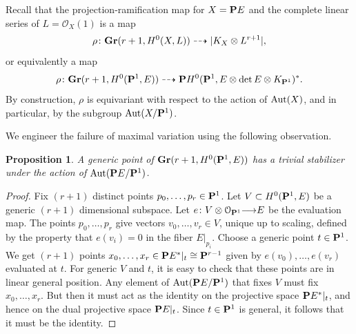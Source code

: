 \documentclass[11pt,reqno]{amsart}
\theoremstyle{plain}
\newtheorem{proposition}[theorem]{Proposition}
\theoremstyle{definition}
\theoremstyle{remark}
\numberwithin{equation}{section}
\renewcommand{\to}{{\longrightarrow}}
\numberwithin{equation}{section}
\renewcommand{\O}{\mathcal O}
\begin{document}
Recall that the projection-ramification map for $X = \P E$ and the complete linear series of $L = \O_X(1)$ is a map
\[ \rho \from \Gr(r+1, H^0(X, L)) \dashrightarrow |K_X \otimes L^{r+1}|,\]
or equivalently a map
\[ \rho \from \Gr(r+1, H^0(\P^1, E)) \dashrightarrow \P H^0(\P^1, E \otimes \det E \otimes K_{\P^1})^*.\]
By construction, $\rho$ is equivariant with respect to the action of $\Aut(X)$, and in particular, by the subgroup $\Aut(X/\P^1)$.

We engineer the failure of maximal variation using the following observation.
\begin{proposition}\label{prop:trivialStabilizer}
  A generic point of $\Gr(r+1, H^0(\P^1, E))$ has a trivial stabilizer under the action of $\Aut(\P E/\P^1)$.
\end{proposition}
\begin{proof}
  Fix $(r+1)$ distinct points $p_0, \dots, p_r \in \P^1$.
  Let $V \subset H^0(\P^1, E)$ be a generic $(r+1)$ dimensional subspace.
  Let $e \from V \otimes \O_{\P^1} \to E$ be the evaluation map.
  The points $p_0, \dots, p_r$ give vectors $v_0, \dots, v_r \in V$, unique up to scaling, defined by the property that $e(v_i) = 0$ in the fiber $E|_{p_i}$.
  Choose a generic point $t \in \P^1$.
  We get $(r+1)$ points $x_0, \dots, x_r \in \P E^*|_{t} \cong \P^{r-1}$ given by $e(v_0), \dots, e(v_r)$ evaluated at $t$.
  For generic $V$ and $t$, it is easy to check that these points are in linear general position.
  Any element of $\Aut(\P E/\P^1)$ that fixes $V$ must fix $x_0, \dots, x_r$.
  But then it must act as the identity on the projective space $\P E^*|_t$, and hence on the dual projective space $\P E|_t$.
  Since $t \in \P^1$ is general, it follows that it must be the identity.
\end{proof}
\end{document}

